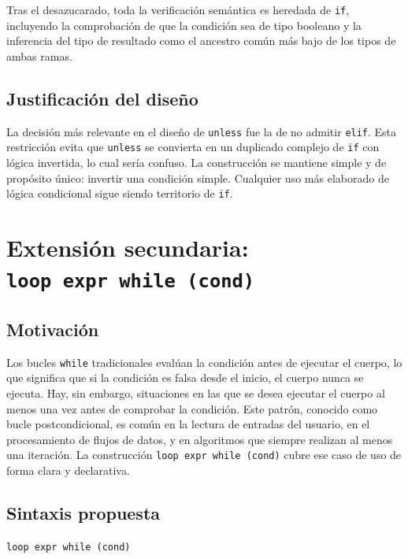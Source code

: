 \documentclass[12pt, a4paper]{article}
\begin{document}
Tras el desazucarado, toda la verificación semántica es heredada de \texttt{if}, incluyendo la comprobación de que la condición sea de tipo booleano y la inferencia del tipo de resultado como el ancestro común más bajo de los tipos de ambas ramas.

\subsection{Justificación del diseño}

La decisión más relevante en el diseño de \texttt{unless} fue la de no admitir \texttt{elif}. Esta restricción evita que \texttt{unless} se convierta en un duplicado complejo de \texttt{if} con lógica invertida, lo cual sería confuso. La construcción se mantiene simple y de propósito único: invertir una condición simple. Cualquier uso más elaborado de lógica condicional sigue siendo territorio de \texttt{if}.

\section{Extensión secundaria: \texttt{loop~expr~while~(cond)}}

\subsection{Motivación}

Los bucles \texttt{while} tradicionales evalúan la condición antes de ejecutar el cuerpo, lo que significa que si la condición es falsa desde el inicio, el cuerpo nunca se ejecuta. Hay, sin embargo, situaciones en las que se desea ejecutar el cuerpo al menos una vez antes de comprobar la condición. Este patrón, conocido como bucle postcondicional, es común en la lectura de entradas del usuario, en el procesamiento de flujos de datos, y en algoritmos que siempre realizan al menos una iteración. La construcción \texttt{loop~expr~while~(cond)} cubre ese caso de uso de forma clara y declarativa.

\subsection{Sintaxis propuesta}

\begin{center}
\texttt{loop expr while (cond)}
\end{center}
\end{document}
